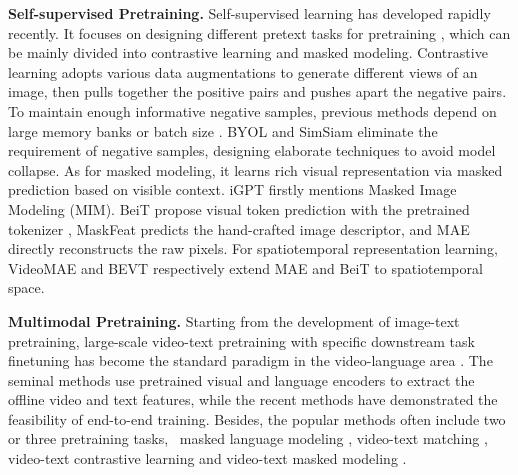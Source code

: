 \textbf{Self-supervised Pretraining.}
Self-supervised learning has developed rapidly recently. It focuses on designing different pretext tasks for pretraining \citep{doersch2015unsupervised,wang2015unsupervised,noroozi2016unsupervised,zhang2016colorful,feichtenhofer2022masked}, which can be mainly divided into contrastive learning and masked modeling. Contrastive learning adopts various data augmentations to generate different views of an image, 
then pulls together the positive pairs and pushes apart the negative pairs.
To maintain enough informative negative samples, previous methods depend on large memory banks or batch size \citep{wu2018unsupervised,he2020momentum,chen2020simple}.
BYOL \citep{byol} and SimSiam \citep{simsiam} eliminate the requirement of negative samples, designing elaborate techniques to avoid model collapse. As for masked modeling,
it learns rich visual representation via masked prediction based on visible context.
iGPT \citep{igpt} firstly mentions Masked Image Modeling (MIM). BeiT \citep{beit} propose visual token prediction with the pretrained tokenizer \citep{ramesh2021zero},
MaskFeat \citep{maskfeat} predicts the hand-crafted image descriptor, and MAE \citep{mae} directly reconstructs the raw pixels. For spatiotemporal representation learning,
VideoMAE \citep{videomae} and BEVT \citep{bevt} respectively extend MAE and BeiT to spatiotemporal space.

\textbf{Multimodal Pretraining.}
Starting from the development of image-text pretraining, large-scale video-text pretraining with specific downstream task finetuning has become the standard paradigm in the video-language area \citep{cpd,MiechASLSZ20,reserve,violet,videoclip,hu2022scaling,dou2022empirical,shen2021much,yao2021filip}. The seminal methods \citep{videobert,actbert} use pretrained visual and language encoders to extract the offline video and text features, while the recent methods \citep{cpd,MiechASLSZ20,clipbert,frozen,merlot,all_in_one} have demonstrated the feasibility of end-to-end training.  Besides, the popular methods often include two or three pretraining tasks,
\eg\, masked language modeling \citep{lavender},  video-text matching \citep{all_in_one}, video-text contrastive learning \citep{videoclip} and video-text masked modeling \citep{violet}.
